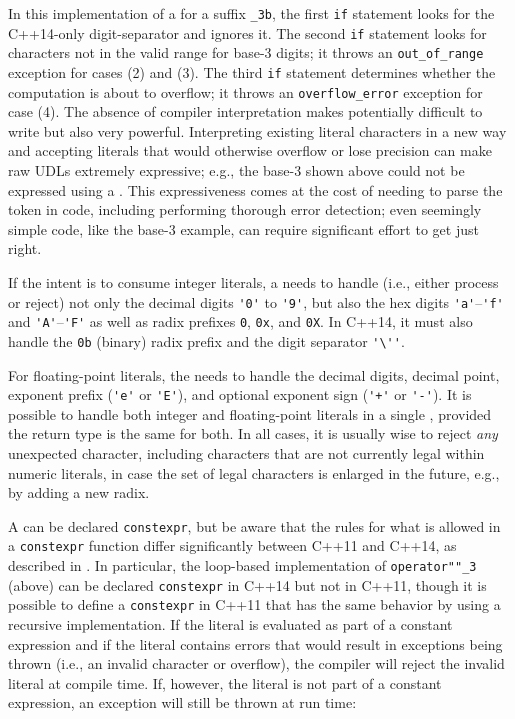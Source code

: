 \noindent In this implementation of a  for a suffix
\lstinline!_3b!, the first \lstinline!if! statement looks for the C++14-only digit-separator and ignores it. The second \lstinline!if! statement
looks for characters not in the valid range for base-3 digits; it throws
an \lstinline!out_of_range! exception for cases (2) and (3). The third
\lstinline!if! statement determines whether the computation is about to
overflow; it throws an \lstinline!overflow_error! exception for case (4).
The absence of compiler interpretation makes 
potentially difficult to write but also very powerful. Interpreting
existing literal characters in a new way and accepting literals that
would otherwise overflow or lose precision can make raw UDLs extremely
expressive; e.g., the base-3  shown above could
not be expressed using a . This
expressiveness comes at the cost of needing to parse the token in code,
including performing thorough error detection; even seemingly simple
code, like the base-3 example, can require significant effort to get
just right.

If the intent is to consume integer literals, a  needs to handle (i.e., either process or reject) not only the
decimal digits \lstinline!'0'! to \lstinline!'9'!, but also the hex digits
\lstinline!'a'!--\lstinline!'f'! and \lstinline!'A'!--\lstinline!'F'! as well as
radix prefixes \lstinline!0!, \lstinline!0x!, and \lstinline!0X!. In C++14, it
must also handle the \lstinline!0b! (binary) radix prefix and the digit
separator \lstinline!'\''!.  

For floating-point literals, the  needs to
handle the decimal digits, decimal point, exponent prefix (\lstinline!'e'!
or \lstinline!'E'!), and optional exponent sign (\lstinline!'+'! or
\lstinline!'-'!). It is possible to handle both integer and floating-point
literals in a single , provided the return type
is the same for both. In all cases, it is usually wise to reject
\emph{any} unexpected character, including characters that are not
currently legal within numeric literals, in case the set of legal
characters is enlarged in the future, e.g., by adding a new radix.

A  can be declared \lstinline!constexpr!, but be
aware that the rules for what is allowed in a \lstinline!constexpr!
function differ significantly between C++11 and C++14, as described in . In particular, the
loop-based implementation of \lstinline!operator""_3! (above) can be
declared \lstinline!constexpr! in C++14 but not in C++11, though it is
possible to define a \lstinline!constexpr!  in C++11
that has the same behavior by using a recursive implementation. If the
literal is evaluated as part of a constant expression and if the literal
contains errors that would result in exceptions being thrown (i.e., an
invalid character or overflow), the compiler will reject the invalid
literal at compile time. If, however, the literal is not part of a
constant expression, an exception will still be thrown at run time:

